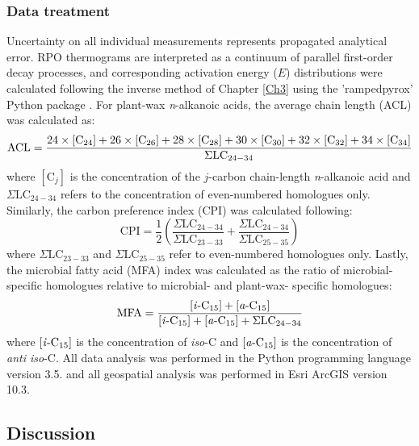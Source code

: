 \subsubsection{Data treatment}

Uncertainty on all individual measurements represents propagated analytical error. RPO thermograms are interpreted as a continuum of parallel first-order decay processes, and corresponding activation energy ($E$) distributions were calculated following the inverse method of Chapter \ref{Ch3} using the 'rampedpyrox' Python package \citep{Hemingway:bA3-kvLz}. For plant-wax \textit{n}-alkanoic acids, the average chain length (ACL) was calculated as:
%
\begin{equation}\label{Ch6Eq:1}
\text{ACL} = \frac{24\times[\ce{C}_{24}] + 26\times[\ce{C}_{26}] + 28\times[\ce{C}_{28}] + 30\times[\ce{C}_{30}] + 32\times[\ce{C}_{32}] + 34\times[\ce{C}_{34}]}{\Sigma \text{LC}_{24-34}}
\end{equation}
%
where $[\text{C}_{j}]$ is the concentration of the $j$-carbon chain-length \textit{n}-alkanoic acid and $\Sigma \text{LC}_{24-34}$ refers to the concentration of even-numbered homologues only. Similarly, the carbon preference index (CPI) was calculated following:
%
\begin{equation}\label{Ch6Eq:2}
\text{CPI} = \frac{1}{2} \left( \frac{\Sigma \text{LC}_{24-34}}{\Sigma \text{LC}_{23-33}} + \frac{\Sigma \text{LC}_{24-34}}{\Sigma \text{LC}_{25-35}} \right)
\end{equation}
%
where $\Sigma \text{LC}_{23-33}$ and $\Sigma \text{LC}_{25-35}$ refer to even-numbered homologues only. Lastly, the microbial fatty acid (MFA) index was calculated as the ratio of microbial-specific homologues relative to microbial- and plant-wax- specific homologues:
%
\begin{equation}\label{Ch6Eq:3}
\text{MFA} = \frac{[\text{\textit{i}-C}_{15}] + [\text{\textit{a}-C}_{15}]}{[\text{\textit{i}-C}_{15}] + [\text{\textit{a}-C}_{15}] + \Sigma \text{LC}_{24-34}}
\end{equation}
%
where $[\text{\textit{i}-C}_{15}]$ is the concentration of \textit{iso}-C and $[\text{\textit{a}-C}_{15}]$ is the concentration of \textit{anti iso}-C. All data analysis was performed in the Python programming language version 3.5. and all geospatial analysis was performed in Esri ArcGIS version 10.3.

\subsection{Discussion}

